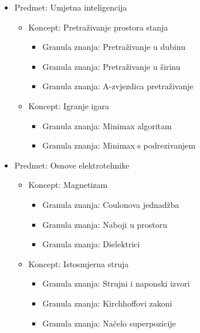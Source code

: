\documentclass[times, utf8, zavrsni, numeric]{fer}
\begin{document}
\begin{itemize}
	\item Predmet: Umjetna inteligencija
	\begin{itemize}
		\item Koncept: Pretraživanje prostora stanja
		\begin{itemize}
			\item Granula znanja: Pretraživanje u dubinu
			\item Granula znanja: Pretraživanje u širinu
			\item Granula znanja: A-zvjezdica pretraživanje
		\end{itemize}
		\item Koncept: Igranje igara
		\begin{itemize}
			\item Granula znanja: Minimax algoritam
			\item Granula znanja: Minimax s podrezivanjem
		\end{itemize}
	\end{itemize}
	\item Predmet: Osnove elektrotehnike
	\begin{itemize}
		\item Koncept: Magnetizam
		\begin{itemize}
			\item Granula znanja: Coulonova jednadžba
			\item Granula znanja: Naboji u prostoru
			\item Granula znanja: Dielektrici
		\end{itemize}
		\item Koncept: Istosmjerna struja
		\begin{itemize}
			\item Granula znanja: Strujni i naponski izvori
			\item Granula znanja: Kirchhoffovi zakoni
			\item Granula znanja: Načelo superpozicije
		\end{itemize}
	\end{itemize}
\end{itemize}
\end{document}
